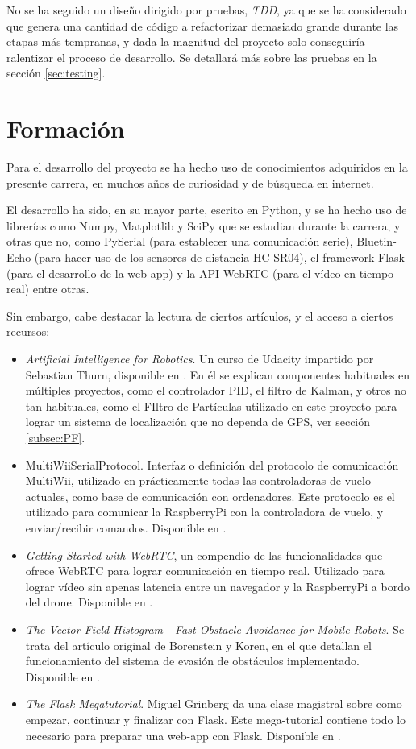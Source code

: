 No se ha seguido un diseño dirigido por pruebas, \emph{TDD}, ya que se ha considerado que genera una cantidad de código a refactorizar demasiado grande durante las etapas más tempranas, y dada la magnitud del proyecto solo conseguiría ralentizar el proceso de desarrollo. 
Se detallará más sobre las pruebas en la sección \ref{sec:testing}.


\section{Formación}

Para el desarrollo del proyecto se ha hecho uso de conocimientos adquiridos en la presente carrera, en muchos años de curiosidad y de búsqueda en internet. 

El desarrollo ha sido, en su mayor parte, escrito en Python, y se ha hecho uso de librerías como Numpy, Matplotlib y SciPy que se estudian durante la carrera, y otras que no, como PySerial (para establecer una comunicación serie), Bluetin-Echo (para hacer uso de los sensores de distancia HC-SR04), el framework Flask (para el desarrollo de la web-app) y la API WebRTC (para el vídeo en tiempo real) entre otras.

Sin embargo, cabe destacar la lectura de ciertos artículos, y el acceso a ciertos recursos:

\begin{itemize}
\item \textit{Artificial Intelligence for Robotics}. Un curso de Udacity impartido por Sebastian Thurn, disponible en \citep{wiki:UdCityPF}. En él se explican componentes habituales en múltiples proyectos, como el controlador PID, el filtro de Kalman, y otros no tan habituales, como el FIltro de Partículas utilizado en este proyecto para lograr un sistema de localización que no dependa de GPS, ver sección \ref{subsec:PF}.
\item MultiWiiSerialProtocol. Interfaz o definición del protocolo de comunicación MultiWii, utilizado en prácticamente todas las controladoras de vuelo actuales, como base de comunicación con ordenadores. Este protocolo es el utilizado para comunicar la RaspberryPi con la controladora de vuelo, y enviar/recibir comandos. Disponible en \citep{wiki:MSPDefinition}.
\item \emph{Getting Started with WebRTC}, un compendio de las funcionalidades que ofrece WebRTC para lograr comunicación en tiempo real. Utilizado para lograr vídeo sin apenas latencia entre un navegador y la RaspberryPi a bordo del drone. Disponible en \citep{wiki:WebRTCFullDesc}.
\item \emph{The Vector Field Histogram - Fast Obstacle Avoidance for Mobile Robots}. Se trata del artículo original de Borenstein y Koren, en el que detallan el funcionamiento del sistema de evasión de obstáculos implementado. Disponible en \citep{art:BorensteinKorenVFH}.
\item \emph{The Flask Megatutorial}. Miguel Grinberg da una clase magistral sobre como empezar, continuar y finalizar con Flask. Este mega-tutorial contiene todo lo necesario para preparar una web-app con Flask. Disponible en \citep{wiki:Flask}.
\end{itemize}

